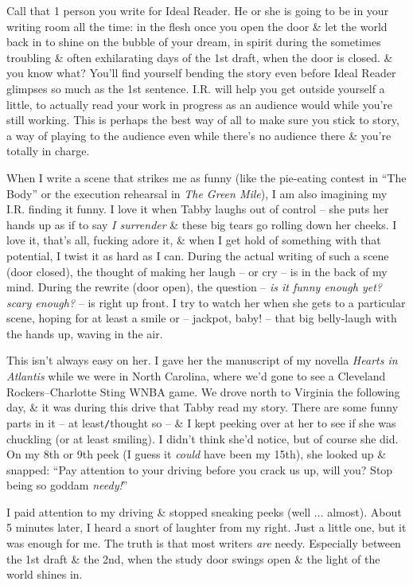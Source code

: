 \documentclass{article}
\numberwithin{equation}{section}
\begin{document}
Call that 1 person you write for Ideal Reader. He or she is going to be in your writing room all the time: in the flesh once you open the door \& let the world back in to shine on the bubble of your dream, in spirit during the sometimes troubling \& often exhilarating days of the 1st draft, when the door is closed. \& you know what? You'll find yourself bending the story even before Ideal Reader glimpses so much as the 1st sentence. I.R. will help you get outside yourself a little, to actually read your work in progress as an audience would while you're still working. This is perhaps the best way of all to make sure you stick to story, a way of playing to the audience even while there's no audience there \& you're totally in charge.

When I write a scene that strikes me as funny (like the pie-eating contest in ``The Body'' or the execution rehearsal in \textit{The Green Mile}), I am also imagining my I.R. finding it funny. I love it when Tabby laughs out of control -- she puts her hands up as if to say \textit{I surrender} \& these big tears go rolling down her cheeks. I love it, that's all, fucking adore it, \& when I get hold of something with that potential, I twist it as hard as I can. During the actual writing of such a scene (door closed), the thought of making her laugh -- or cry -- is in the back of my mind. During the rewrite (door open), the question -- \textit{is it funny enough yet? scary enough?} -- is right up front. I try to watch her when she gets to a particular scene, hoping for at least a smile or -- jackpot, baby! -- that big belly-laugh with the hands up, waving in the air.

This isn't always easy on her. I gave her the manuscript of my novella \textit{Hearts in Atlantis} while we were in North Carolina, where we'd gone to see a Cleveland Rockers--Charlotte Sting WNBA game. We drove north to Virginia the following day, \& it was during this drive that Tabby read my story. There are some funny parts in it -- at least{\tt/}thought so -- \& I kept peeking over at her to see if she was chuckling (or at least smiling). I didn't think she'd notice, but of course she did. On my 8th or 9th peek (I guess it \textit{could} have been my 15th), she looked up \& snapped: ``Pay attention to your driving before you crack us up, will you? Stop being so goddam \textit{needy!}''

I paid attention to my driving \& stopped sneaking peeks (well $\ldots$ almost). About 5 minutes later, I heard a snort of laughter from my right. Just a little one, but it was enough for me. The truth is that most writers \textit{are} needy. Especially between the 1st draft \& the 2nd, when the study door swings open \& the light of the world shines in.
\end{document}
